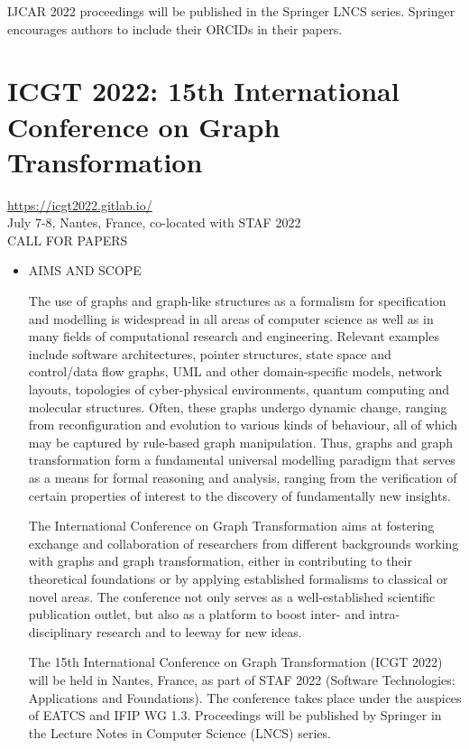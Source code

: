 \documentclass[prodmode,acmtecs]{acmsmall} %
\begin{document}
\begin{itemize}
  IJCAR 2022 proceedings will be published in the Springer LNCS series. Springer encourages authors to include their ORCIDs in their papers. 
 
\end{itemize}\section{ICGT 2022: 15th International Conference on Graph Transformation}\label{ICGT2022}  \href{https://icgt2022.gitlab.io/}{https://icgt2022.gitlab.io/}\\ 
  July 7-8, Nantes, France, co-located with STAF 2022\\ 
CALL FOR PAPERS 

\begin{itemize}\item  AIMS AND SCOPE 
 
  The use of graphs and graph-like structures as a formalism for specification and modelling is widespread in all areas of computer science as well as in many fields of computational research and engineering. Relevant examples include software architectures, pointer structures, state space and control/data flow graphs, UML and other domain-specific models, network layouts, topologies of cyber-physical environments, quantum computing and molecular structures. Often, these graphs undergo dynamic change, ranging from reconfiguration and evolution to various kinds of behaviour, all of which may be captured by rule-based graph manipulation. Thus, graphs and graph transformation form a fundamental universal modelling paradigm that serves as a means for formal reasoning and analysis, ranging from the verification of certain properties of interest to the discovery of fundamentally new insights. 
 
  The International Conference on Graph Transformation aims at fostering exchange and collaboration of researchers from different backgrounds working with graphs and graph transformation, either in contributing to their theoretical foundations or by applying established formalisms to classical or novel areas. The conference not only serves as a well-established scientific publication outlet, but also as a platform to boost inter- and intra-disciplinary research and to leeway for new ideas. 
 
  The 15th International Conference on Graph Transformation (ICGT 2022) will be held in Nantes, France, as part of STAF 2022 (Software Technologies: Applications and Foundations). The conference takes place under the auspices of EATCS and IFIP WG 1.3. Proceedings will be published by Springer in the Lecture Notes in Computer Science (LNCS) series. 
 

\end{itemize}
\end{document}
